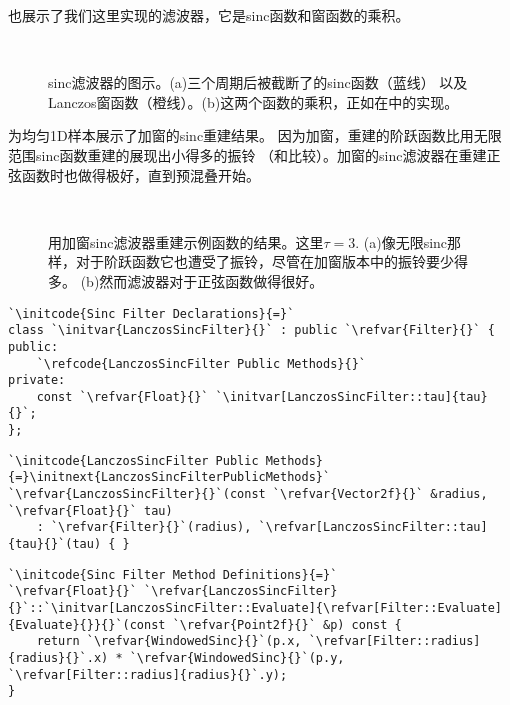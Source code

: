 也展示了我们这里实现的滤波器，它是sinc函数和窗函数的乘积。
\begin{figure}[htbp]
    \centering
    \,
    \caption{sinc滤波器的图示。(a)三个周期后被截断了的sinc函数（蓝线）
        以及Lanczos窗函数（橙线）。(b)这两个函数的乘积，正如在中的实现。}
    \label{fig:7.45}
\end{figure}

为均匀1D样本展示了加窗的sinc重建结果。
因为加窗，重建的阶跃函数比用无限范围sinc函数重建的展现出小得多的振铃
（和比较）。加窗的sinc滤波器在重建正弦函数时也做得极好，直到预混叠开始。
\begin{figure}[htbp]
    \centering
    \,
    \caption{用加窗sinc滤波器重建示例函数的结果。这里$\tau=3$.
        (a)像无限sinc那样，对于阶跃函数它也遭受了振铃，尽管在加窗版本中的振铃要少得多。
        (b)然而滤波器对于正弦函数做得很好。}
    \label{fig:7.46}
\end{figure}

\begin{lstlisting}
`\initcode{Sinc Filter Declarations}{=}`
class `\initvar{LanczosSincFilter}{}` : public `\refvar{Filter}{}` {
public:
    `\refcode{LanczosSincFilter Public Methods}{}`
private:
    const `\refvar{Float}{}` `\initvar[LanczosSincFilter::tau]{tau}{}`;
};
\end{lstlisting}
\begin{lstlisting}
`\initcode{LanczosSincFilter Public Methods}{=}\initnext{LanczosSincFilterPublicMethods}`
`\refvar{LanczosSincFilter}{}`(const `\refvar{Vector2f}{}` &radius, `\refvar{Float}{}` tau)
    : `\refvar{Filter}{}`(radius), `\refvar[LanczosSincFilter::tau]{tau}{}`(tau) { }
\end{lstlisting}
\begin{lstlisting}
`\initcode{Sinc Filter Method Definitions}{=}`
`\refvar{Float}{}` `\refvar{LanczosSincFilter}{}`::`\initvar[LanczosSincFilter::Evaluate]{\refvar[Filter::Evaluate]{Evaluate}{}}{}`(const `\refvar{Point2f}{}` &p) const {
    return `\refvar{WindowedSinc}{}`(p.x, `\refvar[Filter::radius]{radius}{}`.x) * `\refvar{WindowedSinc}{}`(p.y, `\refvar[Filter::radius]{radius}{}`.y);
}
\end{lstlisting}

